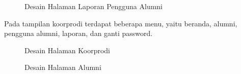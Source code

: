 \begin{figure}[H]
	\centering
	\caption{Desain Halaman Laporan Pengguna Alumni}
	\label{admin_laporanpengguna}
\end{figure}

Pada tampilan koorprodi terdapat beberapa menu, yaitu beranda, alumni, pengguna alumni, laporan, dan ganti password. 

\begin{figure}[H]
	\centering
	\caption{Desain Halaman Koorprodi}
	\label{koorprodi_beranda}
\end{figure}

\begin{figure}[H]
	\centering
	\caption{Desain Halaman Alumni}
	\label{alumni_beranda}
\end{figure}

